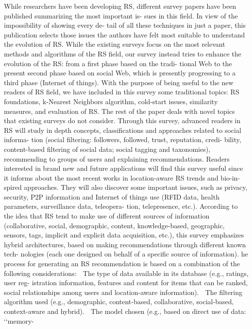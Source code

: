 \documentclass[11pt]{article}
\begin{document}
While researchers have been developing RS, different survey
papers have been published summarizing the most important is-
sues in this field. In view of the impossibility of showing every de-
tail of all these techniques in just a paper, this publication selects
those issues the authors have felt most suitable to understand
the evolution of RS.
While the existing surveys focus on the most relevant methods
and algorithms of the RS field, our survey instead tries to enhance
the evolution of the RS: from a first phase based on the tradi-
tional Web to the present second phase based on social Web,
which is presently progressing to a third phase (Internet of
things). With the purpose of being useful to the new readers of
RS field, we have included in this survey some traditional topics:
RS foundations, k-Nearest Neighbors algorithm, cold-start issues,
similarity measures, and evaluation of RS. The rest of the paper
deals with novel topics that existing surveys do not consider.
Through this survey, advanced readers in RS will study in depth
concepts, classifications and approaches related to social informa-
tion (social filtering: followers, followed, trust, reputation, credi-
bility, content-based filtering of social data; social tagging and
taxonomies), recommending to groups of users and explaining
recommendations. Readers interested in brand new and future
applications will find this survey useful since it informs about
the most recent works in location-aware RS trends and bio-in-
spired approaches. They will also discover some important issues,
such as privacy, security, P2P information and Internet of things
use (RFID data, health parameters, surveillance data, teleopera-
tion, telepresence, etc.).
According to the idea that RS tend to make use of different
sources of information (collaborative, social, demographic, content,
knowledge-based, geographic, sensors, tags, implicit and explicit
data acquisition, etc.), this survey emphasizes hybrid architectures,
based on making recommendations through different known tech-
nologies (each one designed on behalf of a specific source of
information).
he process for generating an RS recommendation is based on a
combination of the following considerations:
 The type of data available in its database (e.g., ratings, user reg-
istration information, features and content for items that can be
ranked, social relationships among users and location-aware
information).
 The filtering algorithm used (e.g., demographic, content-based,
collaborative, social-based, context-aware and hybrid).
 The model chosen (e.g., based on direct use of data: ‘‘memory-
\end{document}
